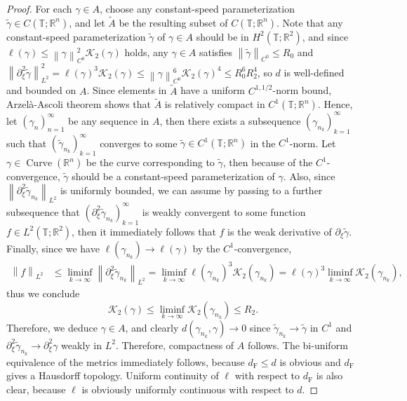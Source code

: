 \documentclass[reqno,centertags,12pt]{amsart}
\theoremstyle{definition}
\numberwithin{equation}{section}
\newcommand{\norm}[1]{\left\|#1\right\|}
\newcommand{\seq}[1]{\left( #1 \right)}
\newcommand{\bbR}{{\mathbb{R}}}
\newcommand{\bbT}{{\mathbb{T}}}
\begin{document}
\begin{proof}
    For each $\gamma\in A$, choose any constant-speed parameterization
    $\tilde{\gamma}\in C(\bbT;\bbR^{n})$, and let $\tilde{A}$ be the resulting
    subset of $C(\bbT;\bbR^{n})$. Note that any constant-speed parameterization
    $\tilde{\gamma}$ of $\gamma\in A$ should be in $H^{2}(\bbT;\bbR^{2})$,
    and since $\ell(\gamma) \leq \norm{\gamma}_{C^{0}}^{2}\mathcal{K}_{2}(\gamma)$ holds,
    any $\gamma\in A$ satisfies $\norm{\tilde{\gamma}}_{C^{0}}\leq R_{0}$ and
    $\norm{\partial_{\xi}^{2}\tilde{\gamma}}_{L^{2}}^{2}
    = \ell(\gamma)^{3}\mathcal{K}_{2}(\gamma) \leq
    \norm{\gamma}_{C^{0}}^{6}\mathcal{K}_{2}(\gamma)^{4}
    \leq R_{0}^{6}R_{2}^{4}$, so $d$ is well-defined and bounded on $A$.
    Since elements in $\tilde{A}$ have a uniform $C^{1,1/2}$-norm bound,
    Arzel\`{a}-Ascoli theorem shows that $\tilde{A}$ is relatively compact in
    $C^{1}(\bbT;\bbR^{n})$. Hence, let $\seq{\gamma_{n}}_{n=1}^{\infty}$ be any
    sequence in $A$, then there exists a subsequence $\seq{\gamma_{n_{k}}}_{k=1}^{\infty}$
    such that $\seq{\tilde{\gamma}_{n_{k}}}_{k=1}^{\infty}$ converges to some
    $\tilde{\gamma}\in C^{1}(\bbT;\bbR^{n})$ in the $C^{1}$-norm.
    Let $\gamma\in\operatorname{Curve}(\bbR^{n})$ be the curve corresponding to
    $\tilde{\gamma}$, then because of the $C^{1}$-convergence, $\tilde{\gamma}$
    should be a constant-speed parameterization of $\gamma$. Also, since
    $\norm{\partial_{\xi}^{2}\tilde{\gamma}_{n_{k}}}_{L^{2}}$ is uniformly bounded,
    we can assume by passing to a further subsequence that
    $\seq{\partial_{\xi}^{2}\tilde{\gamma}_{n_{k}}}_{k=1}^{\infty}$
    is weakly convergent to some function $f\in L^{2}(\bbT;\bbR^{2})$,
    then it immediately follows that $f$ is the weak derivative of
    $\partial_{\xi}\tilde{\gamma}$. Finally, since we have
    $\ell(\gamma_{n_{k}}) \to \ell(\gamma)$ by the $C^{1}$-convergence,
    \begin{align*}
        \norm{f}_{L^{2}} &\leq
        \liminf_{k\to\infty}\norm{\partial_{\xi}^{2}\tilde{\gamma}_{n_{k}}}_{L^{2}}
        = \liminf_{k\to\infty}\ell(\gamma_{n_{k}})^{3}
        \mathcal{K}_{2}(\gamma_{n_{k}})
        = \ell(\gamma)^{3}\liminf_{k\to\infty}\mathcal{K}_{2}(\gamma_{n_{k}}),
    \end{align*}
    thus we conclude
    \[
        \mathcal{K}_{2}(\gamma) \leq
        \liminf_{k\to\infty}\mathcal{K}_{2}(\gamma_{n_{k}}) \leq R_{2}.
    \]
    Therefore, we deduce $\gamma\in A$, and clearly
    $d(\gamma_{n_{k}},\gamma) \to 0$ since $\tilde{\gamma}_{n_{k}} \to \tilde{\gamma}$
    in $C^{1}$ and $\partial_{\xi}^{2}\tilde{\gamma}_{n_{k}} \to \partial_{\xi}^{2}\gamma$
    weakly in $L^{2}$. Therefore, compactness of $A$ follows.
    The bi-uniform equivalence of the metrics immediately follows,
    because $d_{\mathrm{F}}\leq d$ is obvious and $d_{\mathrm{F}}$ gives a
    Hausdorff topology. Uniform continuity of $\ell$ with respect to $d_{\mathrm{F}}$
    is also clear, because $\ell$ is obviously uniformly continuous
    with respect to $d$.
\end{proof}
\end{document}
